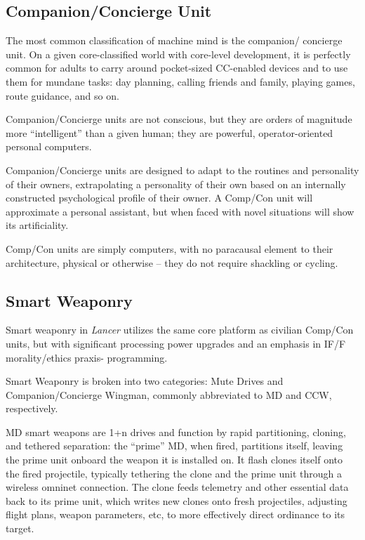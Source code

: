\subsection{Companion/Concierge Unit}

The most common classification of machine mind is the companion/ concierge unit. On a given
core-classified world with core-level development, it is perfectly common for adults to carry
around pocket-sized CC-enabled devices and to use them for mundane tasks: day planning,
calling friends and family, playing games, route guidance, and so on.

Companion/Concierge units are not conscious, but they are orders of magnitude more
``intelligent'' than a given human; they are powerful, operator-oriented personal computers.

Companion/Concierge units are designed to adapt to the routines and personality of their
owners, extrapolating a personality of their own based on an internally constructed psychological
profile of their owner. A Comp/Con unit will approximate a personal assistant, but when faced
with novel situations will show its artificiality.

Comp/Con units are simply computers, with no paracausal element to their architecture, physical
or otherwise -- they do not require shackling or cycling.

\subsection{Smart Weaponry}

Smart weaponry in \textit{Lancer} utilizes the same core platform as civilian Comp/Con units, but with
significant processing power upgrades and an emphasis in IF/F morality/ethics praxis-
programming.

Smart Weaponry is broken into two categories: Mute Drives and Companion/Concierge
Wingman, commonly abbreviated to MD and CCW, respectively.

MD smart weapons are 1+n drives and function by rapid partitioning, cloning, and tethered
separation: the ``prime'' MD, when fired, partitions itself, leaving the prime unit onboard the
weapon it is installed on. It flash clones itself onto the fired projectile, typically tethering the clone
and the prime unit through a wireless omninet connection. The clone feeds telemetry and other
essential data back to its prime unit, which writes new clones onto fresh projectiles, adjusting
flight plans, weapon parameters, etc, to more effectively direct ordinance to its target.

